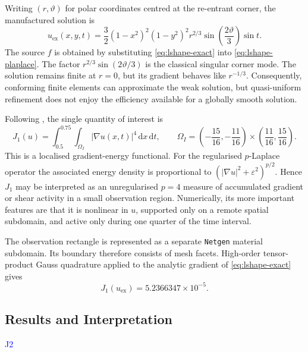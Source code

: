 Writing $(r,\vartheta)$ for polar coordinates centred at the re-entrant corner, the manufactured solution is
\begin{equation}
 u_{\mathrm{ex}}(x,y,t)
 =\frac32(1-x^2)^2(1-y^2)^2
   r^{2/3}\sin\!\left(\frac{2\vartheta}{3}\right)\sin t.
 \label{eq:lshape-exact}
\end{equation}
The source $f$ is obtained by substituting \eqref{eq:lshape-exact} into \eqref{eq:lshape-plaplace}. The factor $r^{2/3}\sin(2\vartheta/3)$ is the classical singular corner mode. The solution remains finite at $r=0$, but its gradient behaves like $r^{-1/3}$. Consequently, conforming finite elements can approximate the weak solution, but quasi-uniform refinement does not enjoy the efficiency available for a globally smooth solution.

Following \cite[Section~6.4.3]{ENDTMAYER202419}, the single quantity of interest is
\begin{equation}
  J_1(u)
  =\int_{0.5}^{0.75}\int_{\Omega_I}|\nabla u(x,t)|^4\,\mathrm dx\,\mathrm dt,
  \qquad
  \Omega_I=
  \left(-\frac{15}{16},-\frac{11}{16}\right)
  \times
  \left(\frac{11}{16},\frac{15}{16}\right).
  \label{eq:lshape-j1}
\end{equation}
This is a localised gradient-energy functional. For the regularised $p$-Laplace operator the associated energy density is proportional to $(|\nabla u|^2+\varepsilon^2)^{p/2}$. Hence $J_1$ may be interpreted as an unregularised $p=4$ measure of accumulated gradient or shear activity in a small observation region. Numerically, its more important features are that it is nonlinear in $u$, supported only on a remote spatial subdomain, and active only during one quarter of the time interval.

The observation rectangle is represented as a separate \texttt{Netgen} material subdomain. Its boundary therefore consists of mesh facets. 
High-order tensor-product Gauss quadrature applied to the analytic gradient of \eqref{eq:lshape-exact} gives
\begin{equation*}
  J_1(u_{\mathrm{ex}})=5.2366347\times10^{-5}.
  \label{eq:lshape-j1-exact}
\end{equation*}


\subsection{Results and Interpretation}
\label{subsec:lshape-discretisation}
\textcolor{blue}{J2}


